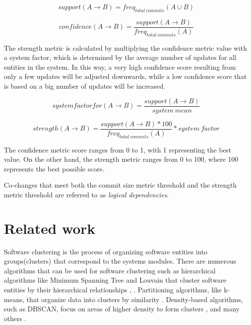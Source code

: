 \documentclass[conference]{IEEEtran}
\begin{document}
\begin{equation}
support (A \rightarrow B) = freq_{total\ commits} {(A \cup B)}
\end{equation}


\begin{equation}
confidence (A \rightarrow B) =\frac{support (A \rightarrow B) }{freq_{total\ commits}(A)}
\end{equation}

 The strength metric is calculated by multiplying the confidence metric value with a system factor, which is determined by the average number of updates for all entities in the system. In this way, a very high confidence score resulting from only a few updates will be adjusted downwards, while a low confidence score that is based on a big number of updates will be increased.

\begin{equation}
 system factor for (A \rightarrow B) =\frac{support (A \rightarrow B) }{system\ mean}
\end{equation}

\begin{equation}
 strength (A \rightarrow B) =\frac{support (A \rightarrow B) * 100}{freq_{total\ commits}(A)} * system\ factor
\end{equation}

The confidence metric score ranges from 0 to 1, with 1 representing the best value. On the other hand, the strength metric ranges from 0 to 100, where 100 represents the best possible score.

Co-changes that meet both the commit size metric threshold and the strength metric threshold are referred to as \textit{logical dependencies}.

\section{Related work}


Software clustering is the process of organizing software entities into groups(clusters) that correspond to the systems modules. There are numerous algorithms that can be used for software clustering such as hierarchical algorithms like Minimum Spanning Tree and Louvain that cluster software entities by their hierarchical relationships \cite{hicluster}, \cite{SoraSem13}. Partitioning algorithms, like k-means, that organize data into clusters by similarity \cite{5453745}. Density-based algorithms, such as DBSCAN, focus on areas of higher density to form clusters \cite{10.1145/304181.304187}, and many others \cite{Xu2015ACS}. 
\end{document}
